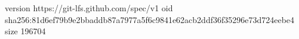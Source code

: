 version https://git-lfs.github.com/spec/v1
oid sha256:81d6ef79b9e2bbaddb87a7977a5f6c9841e62acb2ddf36f35296e73d724eebe4
size 196704
